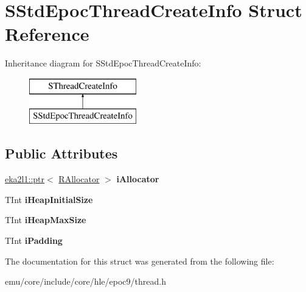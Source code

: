 \hypertarget{struct_s_std_epoc_thread_create_info}{}\section{S\+Std\+Epoc\+Thread\+Create\+Info Struct Reference}
\label{struct_s_std_epoc_thread_create_info}
Inheritance diagram for S\+Std\+Epoc\+Thread\+Create\+Info\+:\begin{figure}[H]
\begin{center}
\leavevmode
\includegraphics[height=2.000000cm]{struct_s_std_epoc_thread_create_info}
\end{center}
\end{figure}
\subsection*{Public Attributes}
\begin{DoxyCompactItemize}
\item 
\mbox{\label{struct_s_std_epoc_thread_create_info_af93f6a84c9c7695e0d97c523d593985d}} 
\mbox{\hyperlink{classeka2l1_1_1ptr}{eka2l1\+::ptr}}$<$ \mbox{\hyperlink{struct_r_allocator}{R\+Allocator}} $>$ {\bfseries i\+Allocator}
\item 
\mbox{\label{struct_s_std_epoc_thread_create_info_ad390cea577147822998c27f2ad0eb93d}} 
T\+Int {\bfseries i\+Heap\+Initial\+Size}
\item 
\mbox{\label{struct_s_std_epoc_thread_create_info_a5fe927e794e7e9d7a810ab0a7e9adc4f}} 
T\+Int {\bfseries i\+Heap\+Max\+Size}
\item 
\mbox{\label{struct_s_std_epoc_thread_create_info_ac5a5e1dd9a58995513832b241fd8a2b7}} 
T\+Int {\bfseries i\+Padding}
\end{DoxyCompactItemize}


The documentation for this struct was generated from the following file\+:\begin{DoxyCompactItemize}
\item 
emu/core/include/core/hle/epoc9/thread.\+h\end{DoxyCompactItemize}
